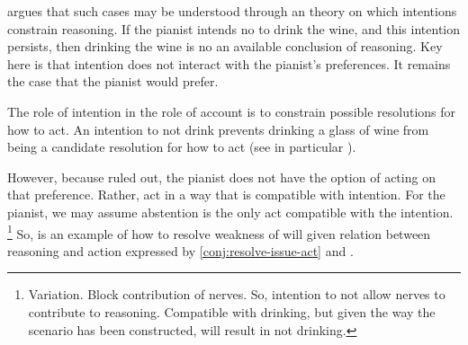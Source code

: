 \begin{note}
  \color{red}

  \citeauthor{Bratman:2007ab} argues that such cases may be understood through an theory on which intentions constrain reasoning.
  If the pianist intends no to drink the wine, and this intention persists, then drinking the wine is no an available conclusion of reasoning.
  Key here is that intention does not interact with the pianist's preferences.
  It remains the case that the pianist would prefer.

  The role of intention in the role of \citeauthor{Bratman:2007ab} account is to constrain possible resolutions for how to act.
  An intention to not drink prevents drinking a glass of wine from being a candidate resolution for how to act (see in particular \textcite[\S3.3]{Bratman:1987aa}).

  However, because ruled out, the pianist does not have the option of acting on that preference.
  Rather, act in a way that is compatible with intention.
  For the pianist, we may assume abstention is the only act compatible with the intention.\nolinebreak
  \footnote{
    \color{red}
    Variation.
    Block contribution of nerves.
    So, intention to not allow nerves to contribute to reasoning.
    Compatible with drinking, but given the way the scenario has been constructed, will result in not drinking.
  }
  So, \citeauthor{Bratman:2007ab} is an example of how to resolve weakness of will given relation between reasoning and action expressed by \autoref{conj:resolve-issue-act} and \ESU{}.
\end{note}

